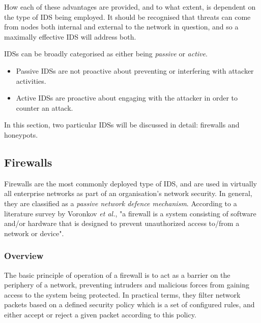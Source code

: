 How each of these advantages are provided, and to what extent, is dependent on the type of IDS being employed. It should be recognised that threats can come from nodes both internal and external to the network in question, and so a maximally effective IDS will address both. 

IDSs can be broadly categorised as either being \textit{passive} or \textit{active}.
\begin{itemize}
\item Passive IDSs are not proactive about preventing or interfering with attacker activities.
\item Active IDSs are proactive about engaging with the attacker in order to counter an attack.
\end{itemize}


In this section, two particular IDSs will be discussed in detail: firewalls and honeypots.


\subsection{Firewalls}

Firewalls are the most commonly deployed type of IDS, and are used in virtually all enterprise networks as part of an organisation's network security. In general, they are classified as a \textit{passive network defence mechanism}. According to a literature survey by Voronkov \textit{et al.}, "a firewall is a system consisting of software and/or hardware that is designed to prevent unauthorized access to/from a network or device". \cite{Voronkov:2017:SLR:3161158.3130876}



\subsubsection{Overview}
The basic principle of operation of a firewall is to act as a barrier on the periphery of a network, preventing intruders and malicious forces from gaining access  to the system being protected. In practical terms, they filter network packets based on a defined security policy which is a set of configured rules, and either accept or reject a given packet according to this policy.



